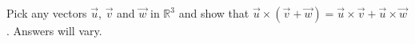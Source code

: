 {Pick any vectors $\vec u$, $\vec v$ and $\vec w$ in $\mathbb{R}^3$ and show that $\vec u \times (\vec v+\vec w) = \vec u\times \vec v+\vec u\times \vec w$.
}
{Answers will vary.
}
